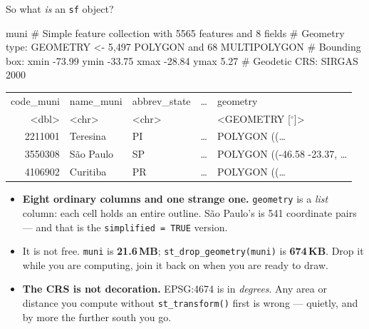 \documentclass[aspectratio=169,10pt]{beamer}
\makeatletter
\newcommand{\code}[1]{\texttt{\small #1}}
\newcommand{\ty}[1]{\textcolor{climgrey}{\textless #1\textgreater}}
\newenvironment{dfbox}[1]
  {\ttfamily\scriptsize\setlength{\tabcolsep}{3.5pt}\begin{tabular}{@{}#1@{}}\toprule}
  {\bottomrule\end{tabular}}
\makeatother
\begin{document}
\begin{frame}[fragile]{So what \emph{is} an \code{sf} object?}
  \vspace{-2pt}
\begin{Rcode}[basicstyle=\ttfamily\scriptsize\color{climdeep}]
muni
# Simple feature collection with 5565 features and 8 fields
# Geometry type: GEOMETRY      <- 5,497 POLYGON and 68 MULTIPOLYGON
# Bounding box:  xmin -73.99  ymin -33.75  xmax -28.84  ymax 5.27
# Geodetic CRS:  SIRGAS 2000
\end{Rcode}
  \vspace{2pt}
  \centering
  \begin{dfbox}{rllll}
    code\_muni & name\_muni & abbrev\_state & \ldots & geometry \\
    \ty{dbl} & \ty{chr} & \ty{chr} & & \ty{GEOMETRY [$^\circ$]} \\
    \midrule
    2211001 & Teresina  & PI & \ldots & POLYGON ((\ldots \\
    3550308 & São Paulo & SP & \ldots & POLYGON ((-46.58 -23.37, \ldots \\
    4106902 & Curitiba  & PR & \ldots & POLYGON ((\ldots \\
  \end{dfbox}

  \flushleft
  \vspace{4pt}
  \begin{itemize}
    \small
    \item \textbf{Eight ordinary columns and one strange one.} \code{geometry} is
          a \emph{list} column: each cell holds an entire outline. São Paulo's is
          541 coordinate pairs --- and that is the \code{simplified = TRUE}
          version.
    \item It is not free. \code{muni} is \textbf{21.6\,MB};
          \code{st\_drop\_geometry(muni)} is \textbf{674\,KB}. Drop it while you
          are computing, join it back on when you are ready to draw.
    \item \textbf{The CRS is not decoration.} EPSG:4674 is in \emph{degrees}. Any
          area or distance you compute without \code{st\_transform()} first is
          wrong --- quietly, and by more the further south you go.
  \end{itemize}
  \src{\code{climate\_data\_in\_R.R} § 3}
\end{frame}
\end{document}
